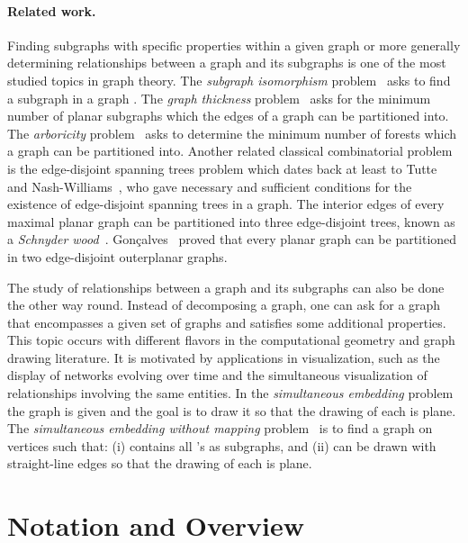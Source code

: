 \documentclass[11pt,a4paper,colorlinks=true,urlcolor=blue,citecolor=red]{article}
\theoremstyle{plain}
\newcommand{\subsubparagraph}[1]{\paragraph{#1}}
\begin{document}
\subsubparagraph{Related work.} Finding subgraphs with specific
properties within a given graph or more generally determining
relationships between a graph and its subgraphs is one of the most
studied topics in graph theory. The \emph{subgraph isomorphism}
problem~\cite{Epp-JGAA-99,GareyJ79,Ullmann76} asks to find a subgraph
 in a graph . The \emph{graph thickness} problem~\cite{mutzel}
asks for the minimum number of planar subgraphs which the edges of a
graph can be partitioned into. The \emph{arboricity}
problem~\cite{Epp-IPL-94} asks to determine the minimum number of
forests which a graph can be partitioned into. Another related classical
combinatorial problem is the  edge-disjoint spanning trees problem
which dates back at least to Tutte~\cite{t-pdgncf-61} and
Nash-Williams~\cite{nw-edstfg-61}, who gave necessary and sufficient
conditions for the existence of  edge-disjoint spanning trees in a
graph. The interior edges of every maximal planar graph can be
partitioned into three edge-disjoint trees, known as a \emph{Schnyder
  wood}~\cite{s-pgpd-89}. Gon\c{c}alves~\cite{1060666} proved that every
planar graph can be partitioned in two edge-disjoint outerplanar graphs.

The study of relationships between a graph and its subgraphs can also be
done the other way round. Instead of decomposing a graph, one can ask for a graph  that encompasses a given set of
graphs  and satisfies some additional properties. This
topic occurs with different flavors in the computational geometry and
graph drawing literature. It is motivated by applications in
visualization, such as the display of networks evolving over time and
the simultaneous visualization of relationships involving the same
entities. In the \emph{simultaneous embedding}
problem~\cite{BrassCDEEIKLM07}
the graph  is given and the goal is to draw it so that
the drawing of each  is plane. The \emph{simultaneous embedding
  without mapping} problem~\cite{BrassCDEEIKLM07} is to find a graph 
on  vertices such that: (i)  contains all 's as subgraphs,
and (ii)  can be drawn with straight-line edges so that the drawing
of each  is plane.

\section{Notation and Overview}\label{sec:def_overview}
\end{document}
